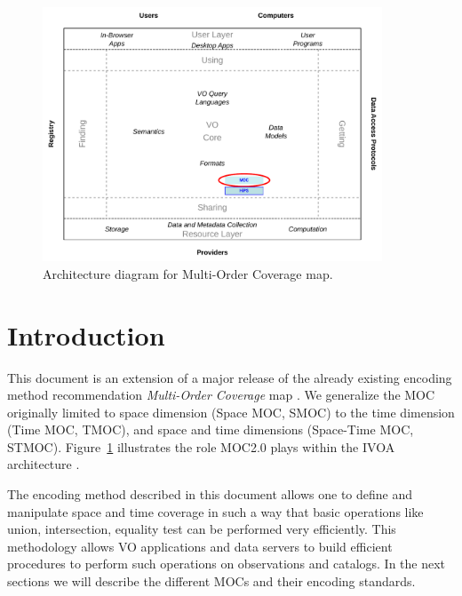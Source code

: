 \documentclass[11pt,a4paper]{ivoa}
\begin{document}
\begin{figure}[!htbp]
\begin{center}
\includegraphics[width=0.9\textwidth]{role_diagram.pdf}
\end{center}
\caption[IVOA architecture diagram]{Architecture diagram for Multi-Order Coverage map.}
\label{fig:ivoadiagram}
\end{figure}

\section{Introduction}
This document is an extension of a major release of
the already existing encoding method recommendation \emph{Multi-Order
  Coverage} map \citep[MOC~1.1,][]{2019ivoa.spec.1007F}. We generalize the MOC
originally limited to space dimension (Space MOC, SMOC) to the time
dimension (Time MOC, TMOC), and space and time dimensions (Space-Time
MOC, STMOC). Figure~\ref{fig:ivoadiagram} illustrates the role MOC2.0
plays within the IVOA architecture \citep{note:VOARCH}.

The encoding method described in this document allows one to define
and manipulate space and time coverage in such a way that basic
operations like union, intersection, equality test can be performed
very efficiently. This methodology allows VO applications and
data servers to build efficient
procedures to perform such operations on observations and catalogs. 
In the next sections we will describe the different MOCs and their
encoding standards.
\end{document}

